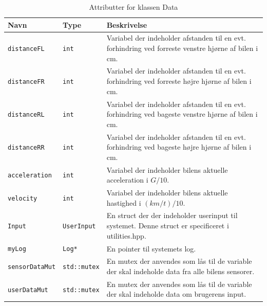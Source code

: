 \begin{table}[h]
\begin{tabularx}{\textwidth}{| Z | Z | L{10cm} |} \hline
Navn & Type & Beskrivelse \\\hline

\texttt{distanceFL} & \texttt{int} &Variabel der indeholder afstanden til en evt. forhindring ved forreste venstre hjørne af bilen i cm.\\\hline

\texttt{distanceFR} & \texttt{int} &Variabel der indeholder afstanden til en evt. forhindring ved forreste højre hjørne af bilen i cm.\\\hline

\texttt{distanceRL} & \texttt{int} &Variabel der indeholder afstanden til en evt. forhindring ved bageste venstre hjørne af bilen i cm.\\\hline

\texttt{distanceRR} & \texttt{int} &Variabel der indeholder afstanden til en evt. forhindring ved bageste højre hjørne af bilen i cm.\\\hline

\texttt{acceleration} & \texttt{int} &Variabel der indeholder bilens aktuelle acceleration i $G / 10$.\\\hline

\texttt{velocity} & \texttt{int} &Variabel der indeholder bilens aktuelle hastighed i $(km/t)/ 10$.\\\hline

\texttt{Input} & \texttt{UserInput} &En struct der der indeholder userinput til systemet. Denne struct er specificeret i utilities.hpp.\\\hline

\texttt{myLog} & \texttt{Log*} &En pointer til systemets log.\\\hline

\texttt{sensorDataMut} & \texttt{std::mutex} &En mutex der anvendes som lås til de variable der skal indeholde data fra alle bilens sensorer.\\\hline

\texttt{userDataMut} & \texttt{std::mutex} &En mutex der anvendes som lås til de variable der skal indeholde data om brugerens input.\\\hline

\end{tabularx}
\caption{Attributter for klassen Data}
\label{table:attr_data}
\end{table}

